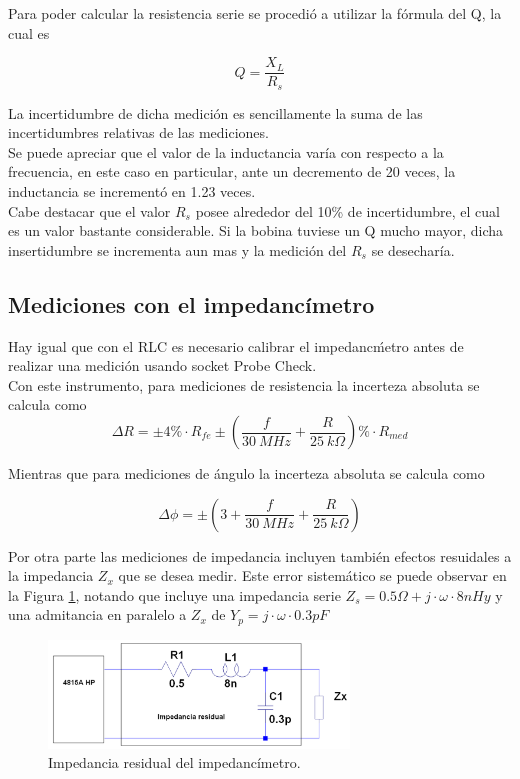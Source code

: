 \documentclass[a4paper,10pt]{article}
\begin{document}
		\indent Para poder calcular la resistencia serie se procedió a utilizar 
		la fórmula del Q, la cual es 

		$$Q = \frac{X_L}{R_s}$$

		\indent La incertidumbre de dicha medición es sencillamente la suma de 
		las incertidumbres relativas de las mediciones. \\
		\indent Se puede apreciar que el valor de la inductancia varía con 
		respecto a la frecuencia, en este caso en particular, ante un decremento
		de 20 veces, la inductancia se incrementó en 1.23 veces. \\
		\indent Cabe destacar que el valor $R_s$ posee alrededor del 10\% de 
		incertidumbre, el cual es un valor bastante considerable. Si la bobina 
		tuviese un Q mucho mayor, dicha insertidumbre se incrementa aun mas y la
		medición del $R_s$ se desecharía. 

	\subsection{Mediciones con el impedanc\'imetro}
		
		\indent Hay igual que con el RLC es necesario calibrar el 
		impedanc\'metro antes de realizar una medici\'on usando socket Probe 
		Check. \\
		\indent Con este instrumento, para mediciones de resistencia la 
		incerteza absoluta se calcula como
		\begin{equation}\label{modulo}
			\Delta R=\pm 4\%\cdot R_{fe}\pm(\frac{f}{30~MHz}+\frac{R}{25~k
			\Omega})\%\cdot R_{med}
		\end{equation}
		
		\indent Mientras que para mediciones de \'angulo la incerteza absoluta 
		se calcula como
		
		\begin{equation}\label{angulo} 
			\Delta\phi=\pm(3+\frac{f}{30~MHz}+\frac{R}{25~k\Omega})
		\end{equation}
		
		\indent Por otra parte las mediciones de impedancia incluyen tambi\'en 
		efectos resuidales a la impedancia $Z_x$ que se desea medir. Este error 
		sistem\'atico se puede observar en la Figura \ref{impres}, notando que 
		incluye una impedancia serie $Z_s=0.5\Omega+j\cdot\omega\cdot8nHy$ y una
		admitancia en paralelo a $Z_x$ de $Y_p=j\cdot\omega\cdot0.3pF$
		
		\begin{figure}[!htb]
			\centering
			\includegraphics[width=8cm]
			{Imagenes/impedanciares.png}
			\caption{Impedancia residual del impedanc\'imetro.}
			\label{impres} 
		\end{figure}
		
\end{document}

